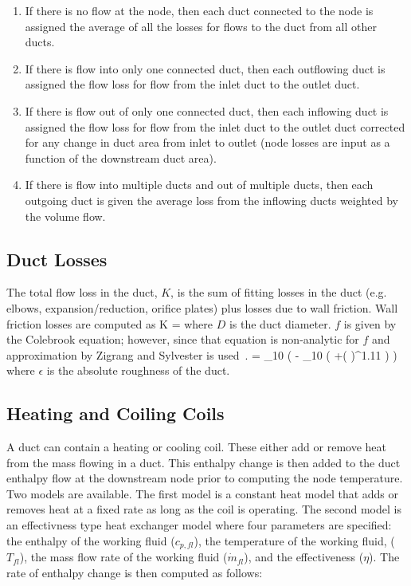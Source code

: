 \begin{enumerate}
\item If there is no flow at the node, then each duct connected to the node is assigned the average of all the losses for flows to the duct from all other ducts. 
\item If there is flow into only one connected duct, then each outflowing duct is assigned the flow loss for flow from the inlet duct to the outlet duct.
\item If there is flow out of only one connected duct, then each inflowing duct is assigned the flow loss for flow from the inlet duct to the outlet duct corrected for any change in duct area from inlet to outlet (node losses are input as a function of the downstream duct area).
\item If there is flow into multiple ducts and out of multiple ducts, then each outgoing duct is given the average loss from the inflowing ducts weighted by the volume flow.
\end{enumerate}

\subsection{Duct Losses}

The total flow loss in the duct, $K$, is the sum of fitting losses in the duct (e.g. elbows, expansion/reduction, orifice plates) plus losses due to wall friction.  Wall friction losses are computed as
\be K \; = \;  \ee
where $D$ is the duct diameter.  $f$ is given by the Colebrook equation; however, since that equation is non-analytic for $f$ and approximation by Zigrang and Sylvester is used~\cite{Zigrang:1}.
\be {} \; =  \log_{10} \left(\; - \;  \log_{10} \left(
+\left(  \right)^{1.11} \right) \right) \ee
where $\epsilon$ is the absolute roughness of the duct.

\subsection{Heating and Coiling Coils}

A duct can contain a heating or cooling coil.  These either add or remove heat from the mass flowing in a duct.  This enthalpy change is then added to the duct enthalpy flow at the downstream node prior to computing the node temperature.  Two models are available.  The first model is a constant heat model that adds or removes heat at a fixed rate as long as the coil is operating.  The second model is an effectivness type heat exchanger model where four parameters are specified: the enthalpy of the working fluid ($c_{p,fl}$), the temperature of the working fluid, ($T_{fl}$), the mass flow rate of the working fluid ($\dot{m}_{fl}$), and the effectiveness ($\eta$).  The rate of enthalpy change is then computed as follows:

